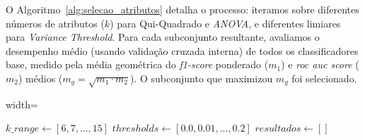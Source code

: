 \documentclass[12pt]{article}
\begin{document}
O Algoritmo~\ref{alg:selecao_atributos} detalha o processo: iteramos sobre diferentes números de atributos ($k$) para Qui-Quadrado e \textit{ANOVA}, e diferentes limiares para \textit{Variance Threshold}. Para cada subconjunto resultante, avaliamos o desempenho médio (usando validação cruzada interna) de todos os classificadores base, medido pela média geométrica do \textit{f1-score} ponderado ($m_1$) e \textit{roc auc score} ($m_2$) médios ($m_g = \sqrt{m_1 \cdot m_2}$). O subconjunto que maximizou $m_g$ foi selecionado.

\begin{adjustbox}{width=\textwidth}
\begin{algorithm}[H]
\footnotesize
\SetInd{0.5em}{0.5em}
\SetAlgoLined
{}

$k\_range \leftarrow [6, 7, ..., 15]$ 
$thresholds \leftarrow [0.0, 0.01, ..., 0.2]$ 
$resultados \leftarrow [ ]$\\

\end{algorithm}
\end{adjustbox}
\end{document}
